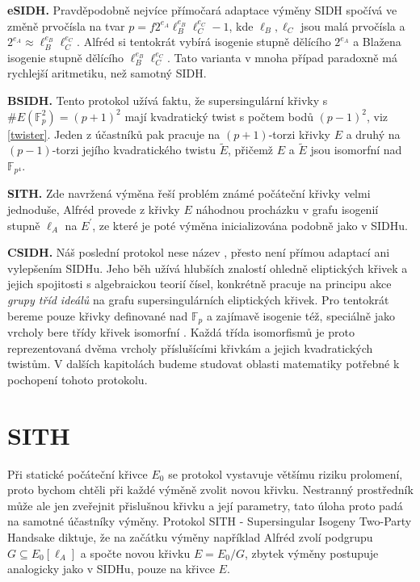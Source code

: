 \documentclass[12pt]{report}
\begin{document}
\textbf{eSIDH.} \cite{eSIDH} Pravděpodobně nejvíce přímočará adaptace výměny SIDH spočívá ve změně prvočísla na tvar $p = f 2^{e_A} \ell_B ^{e_B} \ell_C ^{e_C} - 1$, kde $\ell_B,\ell_C$ jsou malá prvočísla a $2^{e_A} \approx \ell_B ^{e_B} \ell_C ^{e_C}$. Alfréd si tentokrát vybírá isogenie stupně dělícího $2^{e_A}$ a Blažena isogenie stupně dělícího $\ell_B ^{e_B} \ell_C ^{e_C}$. Tato varianta v mnoha případ paradoxně má rychlejší aritmetiku, než samotný SIDH.

\textbf{BSIDH.} \cite{BSIDH} Tento protokol užívá faktu, že supersingulární křivky s $\#E(\mathbb{F}_p^2) = (p+1)^2$ mají kvadratický twist s počtem bodů $(p-1)^2$, viz \ref{twister}. Jeden z účastníků pak pracuje na $(p+1)$-torzi křivky $E$ a druhý na $(p-1)$-torzi jejího kvadratického twistu $\tilde{E}$, přičemž $E$ a $\tilde{E}$ jsou isomorfní nad $\mathbb{F}_{p^4}$.

\textbf{SITH.} \cite{Dark} Zde navržená výměna řeší problém známé počáteční křivky velmi jednoduše, Alfréd provede z křivky $E$ náhodnou procházku v grafu isogenií stupně $\ell_A$ na $E^\prime$, ze které je poté výměna inicializována podobně jako v SIDHu.

\textbf{CSIDH.} \cite{CSIDH} Náš poslední protokol nese název , přesto není přímou adaptací ani vylepšením SIDHu. Jeho běh užívá hlubších znalostí ohledně eliptických křivek a jejich spojitosti s algebraickou teorií čísel, konkrétně pracuje na principu akce \textit{grupy tříd ideálů} na grafu supersingulárních eliptických křivek. Pro tentokrát bereme pouze křivky definované nad $\mathbb{F}_p$ a zajímavě isogenie též, speciálně jako vrcholy bere třídy křivek isomorfní . Každá třída isomorfismů je proto reprezentovaná dvěma vrcholy příslušícími křivkám a jejich kvadratických twistům. V dalších kapitolách budeme studovat oblasti matematiky potřebné k pochopení tohoto protokolu.

\section{SITH}

Při statické počáteční křivce $E_0$ se protokol vystavuje většímu riziku prolomení, proto bychom chtěli při každé výměně zvolit novou křivku. Nestranný prostředník může ale jen zveřejnit přislušnou křivku a její parametry, tato úloha proto padá na samotné účastníky výměny. Protokol SITH - Supersingular Isogeny Two-Party Handsake diktuje, že na začátku výměny například Alfréd zvolí podgrupu $G \subseteq E_0 [\ell_A]$ a spočte novou křivku $E = E_0/G$, zbytek výměny postupuje analogicky jako v SIDHu, pouze na křivce $E$.
\end{document}
